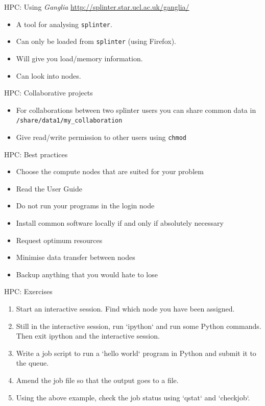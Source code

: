 \documentclass{beamer}
\begin{document}
\begin{frame}{HPC: Using \emph{Ganglia}}
	\url{http://splinter.star.ucl.ac.uk/ganglia/}

	\begin{itemize}
		\item A tool for analysing \texttt{splinter}.
		\item Can only be loaded from \texttt{splinter} (using Firefox).
		\item Will give you load/memory information.
		\item Can look into nodes.
	\end{itemize}
\end{frame}

\begin{frame}{HPC: Collaborative projects}
	\begin{itemize}
		\item For collaborations between two splinter users you can share common data in \texttt{/share/data1/my\_collaboration}
		\item Give read/write permission to other users using \texttt{chmod}
	\end{itemize}
\end{frame}


\begin{frame}{HPC: Best practices}
  \begin{itemize}
    \item Choose the compute nodes that are suited for your problem
    \item Read the User Guide
    \item Do not run your programs in the login node
    \item Install common software locally if and only if absolutely necessary
    \item Request optimum resources
    \item Minimise data transfer between nodes
    \item Backup anything that you would hate to lose
  \end{itemize}
\end{frame}

\begin{frame}{HPC: Exercises}
  \begin{enumerate}
    \item Start an interactive session. Find which node you have been assigned.
    \item Still in the interactive session, run `ipython` and run some Python commands. Then exit ipython and the interactive session.
    \item Write a job script to run a `hello world` program in Python and submit it to the queue.
    \item Amend the job file so that the output goes to a file.
    \item Using the above example, check the job status using `qstat` and `checkjob`.
  \end{enumerate}
\end{frame}
\end{document}
